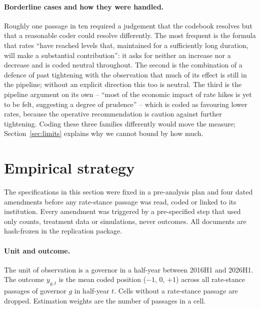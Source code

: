 \documentclass[11pt]{article}
\theoremstyle{plain}
\begin{document}
\paragraph{Borderline cases and how they were handled.}
Roughly one passage in ten required a judgement that the codebook resolves but that a reasonable coder could resolve differently. The most frequent is the formula that rates ``have reached levels that, maintained for a sufficiently long duration, will make a substantial contribution'': it asks for neither an increase nor a decrease and is coded neutral throughout. The second is the combination of a defence of past tightening with the observation that much of its effect is still in the pipeline; without an explicit direction this too is neutral. The third is the pipeline argument on its own -- ``most of the economic impact of rate hikes is yet to be felt, suggesting a degree of prudence'' -- which is coded as favouring lower rates, because the operative recommendation is caution against further tightening. Coding these three families differently would move the measure; Section~\ref{sec:limits} explains why we cannot bound by how much.

\section{Empirical strategy}\label{sec:strategy}

The specifications in this section were fixed in a pre-analysis plan and four dated amendments before any rate-stance passage was read, coded or linked to its institution. Every amendment was triggered by a pre-specified step that used only counts, treatment data or simulations, never outcomes. All documents are hash-frozen in the replication package.

\paragraph{Unit and outcome.}
The unit of observation is a governor in a half-year between 2016H1 and 2026H1. The outcome $y_{g,t}$ is the mean coded position ($-1$, $0$, $+1$) across all rate-stance passages of governor $g$ in half-year $t$. Cells without a rate-stance passage are dropped. Estimation weights are the number of passages in a cell.
\end{document}
